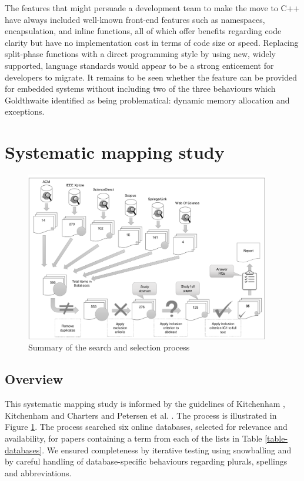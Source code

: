 \documentclass[format=acmsmall, review=false, screen=false]{acmart}
\begin{document}
The features that might persuade a development team to make the move to C++ have always included well-known front-end features such as namespaces, encapsulation, and inline functions, all of which offer benefits regarding code clarity but have no implementation cost in terms of code size or speed. Replacing split-phase functions with a direct programming style by using new, widely supported, language standards would appear to be a strong enticement for developers to migrate. It remains to be seen whether the feature can be provided for embedded systems without including two of the three behaviours which Goldthwaite \cite{Goldthwaite2006} identified as being problematical: dynamic memory allocation and exceptions.

\section{Systematic mapping study}
\label{section:sms}

\begin{figure}[h]
	\includegraphics[width=0.95\textwidth]{summary-of-search-and-selection-process}
	\caption{Summary of the search and selection process}
	\label{fig:sms}
\end{figure}

\subsection{Overview}

This systematic mapping study is informed by the guidelines of Kitchenham \cite{Kitchenham2004}, Kitchenham and Charters \cite{Kitchenham2007} and Petersen et al. \cite{Petersen2008}. The process is illustrated in Figure \ref{fig:sms}. The process searched six online databases, selected for relevance \cite{Brereton2007} and availability, for papers containing a term from each of the lists in Table \ref{table-databases}. We ensured completeness by iterative testing using snowballing \cite{Kitchenham2011a, Petersen2015} and by careful handling of database-specific behaviours regarding plurals, spellings and abbreviations.
\end{document}

